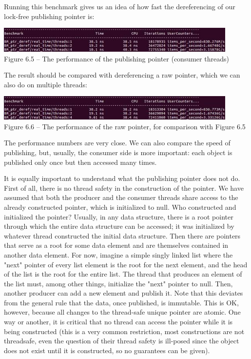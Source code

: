 Running this benchmark gives us an idea of how fast the dereferencing of our lock-free publishing pointer is:

\begin{center}
\includegraphics[width=0.9\textwidth]{content/2/chapter6/images/5.jpg}\\
Figure 6.5 – The performance of the publishing pointer (consumer threads)
\end{center}

The result should be compared with dereferencing a raw pointer, which we can also do on multiple threads:

\begin{center}
\includegraphics[width=0.9\textwidth]{content/2/chapter6/images/6.jpg}\\
Figure 6.6 – The performance of the raw pointer, for comparison with Figure 6.5
\end{center}

The performance numbers are very close. We can also compare the speed of publishing, but, usually, the consumer side is more important: each object is published only once but then accessed many times.

It is equally important to understand what the publishing pointer does not do. First of all, there is no thread safety in the construction of the pointer. We have assumed that both the producer and the consumer threads share access to the already constructed pointer, which is initialized to null. Who constructed and initialized the pointer? Usually, in any data structure, there is a root pointer through which the entire data structure can be accessed; it was initialized by whatever thread constructed the initial data structure. Then there are pointers that serve as a root for some data element and are themselves contained in another data element. For now, imagine a simple singly linked list where the "next" pointer of every list element is the root for the next element, and the head of the list is the root for the entire list. The thread that produces an element of the list must, among other things, initialize the "next" pointer to null. Then, another producer can add a new element and publish it. Note that this deviates from the general rule that the data, once published, is immutable. This is OK, however, because all changes to the thread-safe unique pointer are atomic. One way or another, it is critical that no thread can access the pointer while it is being constructed (this is a very common restriction, most constructions are not threadsafe, even the question of their thread safety is ill-posed since the object does not exist until it is constructed, so no guarantees can be given).

